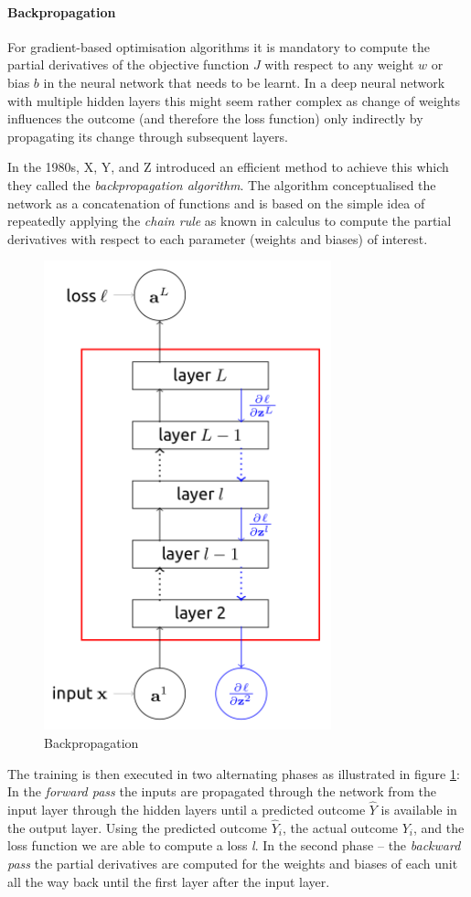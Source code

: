 \paragraph{Backpropagation} For gradient-based optimisation algorithms it is mandatory to compute the partial derivatives of the objective function $J$ with respect to any weight $w$ or bias $b$ in the neural network that needs to be learnt. In a deep neural network with multiple hidden layers this might seem rather complex as change of weights influences the outcome (and therefore the loss function) only indirectly by propagating its change through subsequent layers. 

In the 1980s, X, Y, and Z %
introduced an efficient method to achieve this which they called the \emph{backpropagation algorithm}. The algorithm conceptualised the network as a concatenation of functions and is based on the simple idea of repeatedly applying the \emph{chain rule} as known in calculus to compute the partial derivatives with respect to each parameter (weights and biases) of interest. 


\begin{figure}
	\caption{Backpropagation}\label{fig:backpropagation}   
	\centering
	\includegraphics[height=0.6\textwidth]{figures/chapter-2/backpropagation.png}
\end{figure}


The training is then executed in two alternating phases as illustrated in figure \ref{fig:backpropagation}: In the \emph{forward pass} the inputs are propagated through the network from the input layer through the hidden layers until a predicted outcome $\hat{Y}$ is available in the output layer. Using the predicted outcome $\hat{Y}_i$, the actual outcome $Y_i$, and the loss function we are able to compute a loss \emph{l}.
In the second phase -- the \emph{backward pass} the partial derivatives are computed for the weights and biases of each unit all the way back until the first layer after the input layer. 

